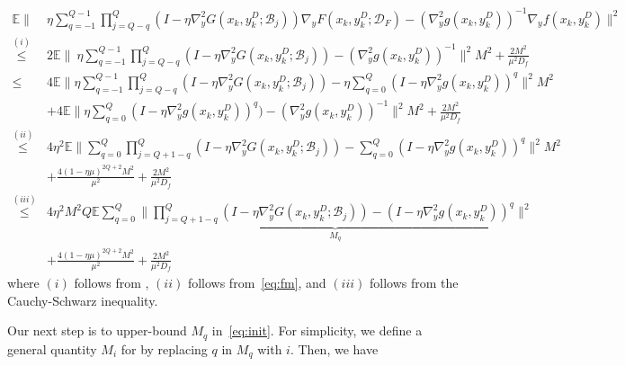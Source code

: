 \documentclass{osudissert96}
\def\gB{{\mathcal{B}}}
\def\gD{{\mathcal{D}}}
\begin{document}
{\small
\begin{align}\label{eq:init}
\mathbb{E} \bigg\|& \eta \sum_{q=-1}^{Q-1}\prod_{j=Q-q}^Q (I - \eta \nabla_y^2G(x_k,y_k^D;\gB_j)) \nabla_y F(x_k,y_k^D;\gD_F)-( \nabla_y^2 g(x_k,y_k^D))^{-1}\nabla_y f(x_k,y_k^D)\bigg\|^2 \nonumber
\\ \overset{(i)}\leq & 2\mathbb{E} \bigg\| \ \eta \sum_{q=-1}^{Q-1}\prod_{j=Q-q}^Q (I - \eta \nabla_y^2G(x_k,y_k^D;\gB_j))  -  ( \nabla_y^2 g(x_k,y_k^D))^{-1} \bigg \|^2M^2 + \frac{2M^2}{\mu^2D_f}  \nonumber
\\\leq& 4\mathbb{E}\bigg\|  \eta \sum_{q=-1}^{Q-1}\prod_{j=Q-q}^Q (I - \eta \nabla_y^2G(x_k,y_k^D;\gB_j)) -  \eta\sum_{q=0}^Q(I - \eta \nabla_y^2g(x_k,y_k^D))^q \bigg \|^2 M^2 \nonumber
\\&+ 4\mathbb{E}\bigg\|\eta\sum_{q=0}^Q(I - \eta \nabla_y^2g(x_k,y_k^D))^q) -  ( \nabla_y^2 g(x_k,y_k^D))^{-1} \bigg \|^2 M^2+ \frac{2M^2}{\mu^2D_f}  \nonumber
\\\overset{(ii)}\leq & 4\eta^2 \mathbb{E}\bigg\| \sum_{q=0}^{Q}\prod_{j=Q+1-q}^Q (I - \eta \nabla_y^2G(x_k,y_k^D;\gB_j)) -  \sum_{q=0}^Q(I - \eta \nabla_y^2g(x_k,y_k^D))^q \bigg \|^2M^2  \nonumber
\\&+\frac{4(1-\eta \mu)^{2Q+2}M^2}{\mu^2}+ \frac{2M^2}{\mu^2D_f}  \nonumber
\\\overset{(iii)}\leq&4\eta^2 M^2 Q\mathbb{E} \sum_{q=0}^{Q} \underbrace{\bigg\|\prod_{j=Q+1-q}^Q (I - \eta \nabla_y^2G(x_k,y_k^D;\gB_j))-  (I - \eta \nabla_y^2g(x_k,y_k^D))^q \bigg \|^2}_{M_q}   \nonumber
\\&+\frac{4(1-\eta \mu)^{2Q+2}M^2}{\mu^2}  + \frac{2M^2}{\mu^2D_f}
\end{align}
}
\hspace{-0.15cm}where $(i)$ follows from , $(ii)$ follows from~\cref{eq:fm},  
 and $(iii)$ follows from the Cauchy-Schwarz inequality.

 Our next step is to upper-bound $M_q$ in~\cref{eq:init}. For simplicity, we define a general quantity $M_i$ for by replacing  $q$ in $M_q$ with $i$. Then, we have 
 
\end{document}
